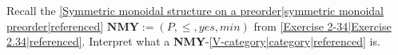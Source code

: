 
Recall the \ref{Symmetric monoidal structure on a preorder|symmetric monoidal preorder|referenced} $\mathbf{NMY} := (P,\leq, yes, min)$ from \ref{Exercise 2-34|Exercise 2.34|referenced}. Interpret what a \textbf{NMY}-\ref{V-category|category|referenced} is.